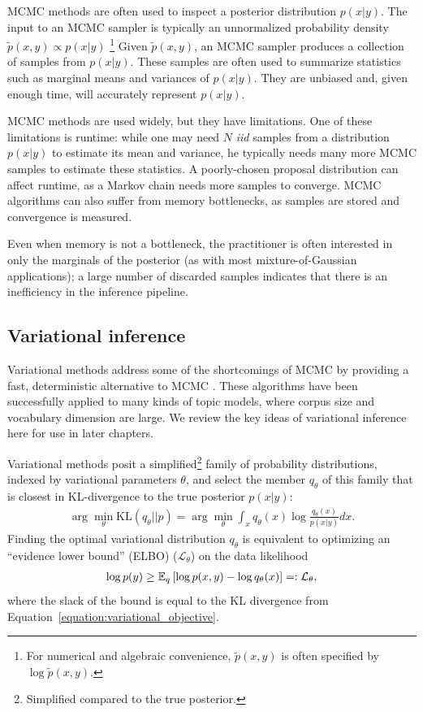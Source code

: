 MCMC methods are often used to inspect a posterior distribution $p(x |
y)$.  The input to an MCMC sampler is typically an unnormalized
probability density $\tilde p(x, y) \propto p(x | y)$ \footnote{For
  numerical and algebraic convenience, $\tilde p(x, y)$ is often
  specified by $\log \tilde p(x, y)$.}  Given $\tilde p(x, y)$, an
MCMC sampler produces a collection of samples from $p(x | y)$.  These
samples are often used to summarize statistics such as marginal means
and variances of $p(x | y)$.  They are unbiased and, given enough
time, will accurately represent $p(x | y)$.

MCMC methods are used widely, but they have limitations.
One of these limitations is runtime: while one may need $N$ \emph{iid}
samples from a distribution $p(x | y)$ to estimate its mean and
variance, he typically needs many more MCMC samples to estimate these
statistics.  A poorly-chosen proposal distribution can affect runtime,
as a Markov chain needs more samples to converge. MCMC algorithms can
also suffer from memory bottlenecks, as samples are stored and
convergence is measured.

Even when memory is not a bottleneck, the practitioner is often
interested in only the marginals of the posterior (as with most
mixture-of-Gaussian applications); a large number of discarded samples
indicates that there is an inefficiency in the inference pipeline.

\subsection{Variational inference}
\label{section:variational_inference}

Variational methods address some of the shortcomings of MCMC by
providing a fast, deterministic alternative to MCMC
\cite{jordan:2003,jordan:1999}. These algorithms have been
successfully applied to many kinds of topic models, where corpus size
and vocabulary dimension are large.  We review the key ideas of
variational inference here for use in later chapters.

Variational methods posit a simplified\footnote{Simplified compared to
  the true posterior.} family of probability distributions, indexed by
variational parameters $\theta$, and select the member $q_\theta$ of
this family that is closest in KL-divergence to the true posterior
$p(x | y)$:
\begin{align}
  \arg \min_{\theta} \mbox{KL}(q_\theta || p) = \arg \min_{\theta} \int_x q_\theta(x) \log \frac{q_\theta(x)}{p(x | y)} dx.
  \label{equation:variational_objective}
\end{align}
Finding the optimal variational distribution $q_\theta$ is equivalent
to optimizing an ``evidence lower bound'' (ELBO) ($\mathcal{L}_\theta$) on
the data likelihood
\begin{eqnarray}
  \log p(y) \ge \mathbb{E}_q\left[\log p(x, y) - \log q_\theta(x)\right]
  =: \mathcal{L}_\theta,
  \label{equation:traditional_variational_objective}
\end{eqnarray}
where the slack of the bound is equal to the KL divergence from
Equation~\ref{equation:variational_objective}.

